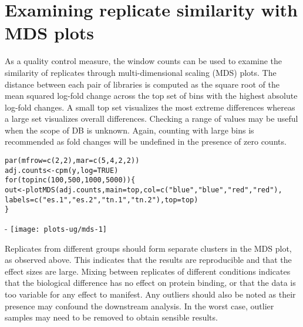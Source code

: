 \documentclass{report}\usepackage[]{graphicx}\usepackage[usenames,dvipsnames]{color}
\makeatletter
\def\maxwidth{ %
  \ifdim\Gin@nat@width>\linewidth
    \linewidth
  \else
    \Gin@nat@width
  \fi
}
\newcommand{\hlnum}[1]{\textcolor[rgb]{0.816,0.125,0.439}{#1}}%
\newcommand{\hlstr}[1]{\textcolor[rgb]{0.251,0.627,0.251}{#1}}%
\newcommand{\hlstd}[1]{\textcolor[rgb]{0.251,0.251,0.251}{#1}}%
\newcommand{\hlkwa}[1]{\textcolor[rgb]{0.125,0.125,0.941}{#1}}%
\newcommand{\hlkwb}[1]{\textcolor[rgb]{0,0,0}{#1}}%
\newcommand{\hlkwc}[1]{\textcolor[rgb]{0.251,0.251,0.251}{#1}}%
\newcommand{\hlkwd}[1]{\textcolor[rgb]{0.878,0.439,0.125}{#1}}%
\newenvironment{knitrout}{}{} %
\makeatother
\begin{document}
\section{Examining replicate similarity with MDS plots}
As a quality control measure, the window counts can be used to examine the similarity of replicates through multi-dimensional scaling (MDS) plots. 
The distance between each pair of libraries is computed as the square root of the mean squared log-fold change across the top set of bins with the highest absolute log-fold changes.
A small top set visualizes the most extreme differences whereas a large set visualizes overall differences.
Checking a range of  values may be useful when the scope of DB is unknown.
Again, counting with large bins is recommended as fold changes will be undefined in the presence of zero counts.

\begin{knitrout}
\color{fgcolor}\begin{kframe}
\begin{alltt}
\hlkwd{par}\hlstd{(}\hlkwc{mfrow}\hlstd{=}\hlkwd{c}\hlstd{(}\hlnum{2}\hlstd{,}\hlnum{2}\hlstd{),} \hlkwc{mar}\hlstd{=}\hlkwd{c}\hlstd{(}\hlnum{5}\hlstd{,}\hlnum{4}\hlstd{,}\hlnum{2}\hlstd{,}\hlnum{2}\hlstd{))}
\hlstd{adj.counts} \hlkwb{<-} \hlkwd{cpm}\hlstd{(y,} \hlkwc{log}\hlstd{=}\hlnum{TRUE}\hlstd{)}
\hlkwa{for} \hlstd{(top} \hlkwa{in} \hlkwd{c}\hlstd{(}\hlnum{100}\hlstd{,} \hlnum{500}\hlstd{,} \hlnum{1000}\hlstd{,} \hlnum{5000}\hlstd{)) \{}
    \hlstd{out} \hlkwb{<-} \hlkwd{plotMDS}\hlstd{(adj.counts,} \hlkwc{main}\hlstd{=top,} \hlkwc{col}\hlstd{=}\hlkwd{c}\hlstd{(}\hlstr{"blue"}\hlstd{,} \hlstr{"blue"}\hlstd{,} \hlstr{"red"}\hlstd{,} \hlstr{"red"}\hlstd{),}
                   \hlkwc{labels}\hlstd{=}\hlkwd{c}\hlstd{(}\hlstr{"es.1"}\hlstd{,} \hlstr{"es.2"}\hlstd{,} \hlstr{"tn.1"}\hlstd{,} \hlstr{"tn.2"}\hlstd{),} \hlkwc{top}\hlstd{=top)}
\hlstd{\}}
\end{alltt}
\end{kframe}\begin{adjustwidth}{0mm}{-\fltoffset}
\texttt{[image: plots-ug/mds-1]} \end{adjustwidth}
\end{knitrout}

Replicates from different groups should form separate clusters in the MDS plot, as observed above.
This indicates that the results are reproducible and that the effect sizes are large.
Mixing between replicates of different conditions indicates that the biological difference has no effect on protein binding, or that the data is too variable for any effect to manifest.
Any outliers should also be noted as their presence may confound the downstream analysis.
In the worst case, outlier samples may need to be removed to obtain sensible results.
\end{document}
